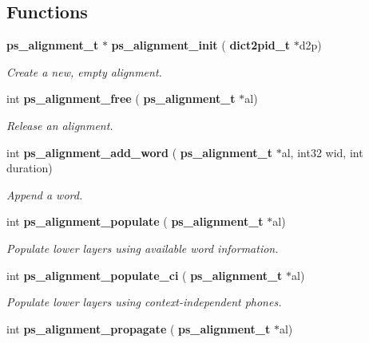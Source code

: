 \subsection*{Functions}
\begin{DoxyCompactItemize}
\item 
\mbox{\label{ps__alignment_8c_abe7668d9a53be1401896623ed42f02be}} 
\textbf{ ps\+\_\+alignment\+\_\+t} $\ast$ \textbf{ ps\+\_\+alignment\+\_\+init} (\textbf{ dict2pid\+\_\+t} $\ast$d2p)
\begin{DoxyCompactList}\small\item\em Create a new, empty alignment. \end{DoxyCompactList}\item 
\mbox{\label{ps__alignment_8c_ab8fa505f155e38d7e6f8b7dbbd070282}} 
int \textbf{ ps\+\_\+alignment\+\_\+free} (\textbf{ ps\+\_\+alignment\+\_\+t} $\ast$al)
\begin{DoxyCompactList}\small\item\em Release an alignment. \end{DoxyCompactList}\item 
\mbox{\label{ps__alignment_8c_ab6264685976a8270971c86deae7a488e}} 
int \textbf{ ps\+\_\+alignment\+\_\+add\+\_\+word} (\textbf{ ps\+\_\+alignment\+\_\+t} $\ast$al, int32 wid, int duration)
\begin{DoxyCompactList}\small\item\em Append a word. \end{DoxyCompactList}\item 
\mbox{\label{ps__alignment_8c_a59e81853dad3d935755dcb309d8cc926}} 
int \textbf{ ps\+\_\+alignment\+\_\+populate} (\textbf{ ps\+\_\+alignment\+\_\+t} $\ast$al)
\begin{DoxyCompactList}\small\item\em Populate lower layers using available word information. \end{DoxyCompactList}\item 
\mbox{\label{ps__alignment_8c_ae17f691c36070955e32a2c987910acde}} 
int \textbf{ ps\+\_\+alignment\+\_\+populate\+\_\+ci} (\textbf{ ps\+\_\+alignment\+\_\+t} $\ast$al)
\begin{DoxyCompactList}\small\item\em Populate lower layers using context-\/independent phones. \end{DoxyCompactList}\item 
\mbox{\label{ps__alignment_8c_adc8ea5411f8500a0affcec636d65fa8d}} 
int \textbf{ ps\+\_\+alignment\+\_\+propagate} (\textbf{ ps\+\_\+alignment\+\_\+t} $\ast$al)

\end{DoxyCompactItemize}
